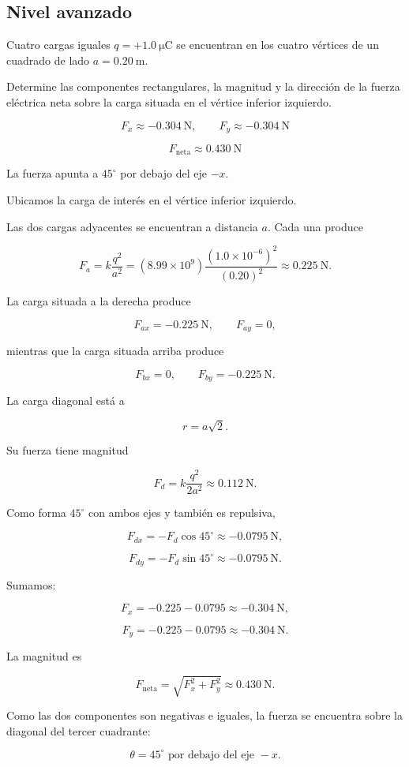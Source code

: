 \subsection{Nivel avanzado}

\begin{ejercicio}
Cuatro cargas iguales \(q=+\SI{1.0}{\micro\coulomb}\) se encuentran en los
cuatro vértices de un cuadrado de lado \(a=\SI{0.20}{\metre}\).

Determine las componentes rectangulares, la magnitud y la dirección de la
fuerza eléctrica neta sobre la carga situada en el vértice inferior
izquierdo.
\end{ejercicio}

\begin{respuesta}
\[
\boxed{F_x\approx-\SI{0.304}{\newton}}, \qquad
\boxed{F_y\approx-\SI{0.304}{\newton}}
\]

\[
\boxed{F_{\text{neta}}\approx\SI{0.430}{\newton}}
\]

La fuerza apunta a \(45^\circ\) por debajo del eje \(-x\).
\end{respuesta}

\begin{explicacion}
Ubicamos la carga de interés en el vértice inferior izquierdo.

Las dos cargas adyacentes se encuentran a distancia \(a\). Cada una produce

\[
F_a=k\frac{q^2}{a^2}
=(8.99\times10^9)
\frac{(1.0\times10^{-6})^2}{(0.20)^2}
\approx\SI{0.225}{\newton}.
\]

La carga situada a la derecha produce

\[
F_{ax}=-\SI{0.225}{\newton}, \qquad F_{ay}=0,
\]

mientras que la carga situada arriba produce

\[
F_{bx}=0, \qquad F_{by}=-\SI{0.225}{\newton}.
\]

La carga diagonal está a

\[
r=a\sqrt2.
\]

Su fuerza tiene magnitud

\[
F_d=k\frac{q^2}{2a^2}\approx\SI{0.112}{\newton}.
\]

Como forma \(45^\circ\) con ambos ejes y también es repulsiva,

\[
F_{dx}=-F_d\cos45^\circ\approx-\SI{0.0795}{\newton},
\]

\[
F_{dy}=-F_d\sin45^\circ\approx-\SI{0.0795}{\newton}.
\]

Sumamos:

\[
F_x=-0.225-0.0795\approx-\SI{0.304}{\newton},
\]

\[
F_y=-0.225-0.0795\approx-\SI{0.304}{\newton}.
\]

La magnitud es

\[
F_{\text{neta}}
=\sqrt{F_x^2+F_y^2}
\approx\SI{0.430}{\newton}.
\]

Como las dos componentes son negativas e iguales, la fuerza se encuentra
sobre la diagonal del tercer cuadrante:

\[
\boxed{\theta=45^\circ\text{ por debajo del eje }-x}.
\]
\end{explicacion}


